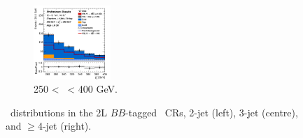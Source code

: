 \begin{figure}[h!]
\begin{subfigure}[b]{\textwidth}
        \includegraphics[width=0.32\textwidth]{Images/VH/Own_fit/postfit_VHbb/Region_distpTV_BMax400_BMin250_DCRHigh_J4_TTypebb_incJet1_T2_L2_Y6051_GlobalFit_conditionnal_mu1.png}
        \caption{250 < \ptv\ < 400 GeV.}
        \label{fig:plots_VHbb_2L_250_CRH}
    \end{subfigure}
    \caption{\ptv\ distributions in the 2L $BB$-tagged \highdr\ CRs, 2-jet (left), 3-jet (centre), and $\geq$4-jet (right).}
    \label{fig:plots_VHbb_2L_CRH}
\end{figure} 
\vspace*{\fill}